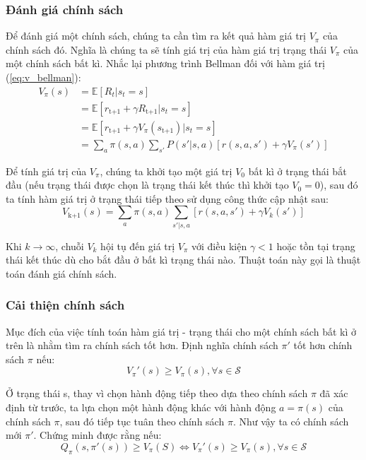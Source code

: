 \documentclass{uetgraduation}
\begin{document}
\subsubsection{Đánh giá chính sách}
Để đánh giá một chính sách, chúng ta cần tìm ra kết quả hàm giá trị $V_\pi$ của chính sách đó. Nghĩa là chúng ta sẽ tính giá trị của hàm giá trị trạng thái $V_\pi$ của một chính sách bất kì.
Nhắc lại phương trình Bellman đối với hàm giá trị (\ref{eq:v_bellman}):
\begin{equation}
    \begin{split}
        V_\pi (s) &= \mathbb{E} [R_t | s_t = s] \\
        &= \mathbb{E} [r_\text{t+1} + \gamma R_\text{t+1} | s_t = s] \\
        &= \mathbb{E} [r_\text{t+1} + \gamma V_\pi (s_\text{t+1}) | s_t = s] \\
        &= \sum_{a} \pi(s, a) \sum_{s'} P(s' | s, a) [r(s, a, s') + \gamma V_\pi (s')]
    \end{split}
\end{equation}

Để tính giá trị của $V_\pi$, chúng ta khởi tạo một giá trị $V_0$ bất kì ở trạng thái bắt đầu (nếu trạng thái được chọn là trạng thái kết thúc thì khởi tạo $V_0 = 0$), sau đó ta tính hàm giá trị
ở trạng thái tiếp theo sử dụng công thức cập nhật sau:
\begin{equation}
    V_\text{k+1} (s) = \sum_{a} \pi (s, a) \sum_{s' | s, a} [r(s, a, s') + \gamma V_k (s')]
\end{equation}

Khi $k \to \infty$, chuỗi $V_k$ hội tụ đến giá trị $V_\pi$ với điều kiện $\gamma < 1$ hoặc tồn tại trạng thái kết thúc dù cho bắt đầu ở bất kì trạng thái nào. Thuật toán này gọi là thuật toán đánh giá
chính sách.

\subsubsection{Cải thiện chính sách}
Mục đích của việc tính toán hàm giá trị - trạng thái cho một chính sách bất kì ở trên là nhằm tìm ra chính sách tốt hơn. Định nghĩa chính sách $\pi'$ tốt hơn chính sách $\pi$ nếu:
\begin{equation}
    V_\pi' (s) \geq V_\pi (s), \forall s \in \mathcal{S}
\end{equation}

Ở trạng thái s, thay vì chọn hành động tiếp theo dựa theo chính sách $\pi$ đã xác định từ trước, ta lựa chọn một hành động khác với hành động $a = \pi(s)$ của chính sách $\pi$, sau
đó tiếp tục tuân theo chính sách $\pi$. Như vậy ta có chính sách mới $\pi'$. Chứng minh được rằng nếu:
\begin{equation}
    Q_\pi(s, \pi'(s)) \geq V_\pi (S) \iff V_\pi' (s) \geq V_\pi (s), \forall s \in \mathcal{S}
    \label{eq:q_better_policy}
\end{equation}
\end{document}
